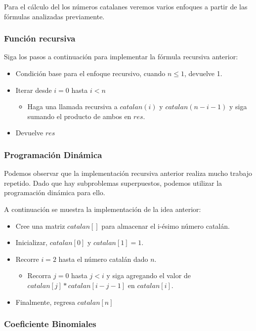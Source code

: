 Para el cálculo del los números catalanes veremos varios enfoques a partir de las fórmulas analizadas previamente.

\subsubsection{Función recursiva}
Siga los pasos a continuación para implementar la fórmula recursiva anterior:

\begin{itemize}
	\item Condición base para el enfoque recursivo, cuando $n \le 1$, devuelve 1.
	\item Iterar desde $i = 0$ hasta $i < n$
	\begin{itemize}
		\item Haga una llamada recursiva a $catalan(i)$ y $catalan(n-i-1)$ y siga sumando el producto de ambos en $res$.
	\end{itemize}
	\item Devuelve $res$
\end{itemize}

\subsubsection{Programación Dinámica}

Podemos observar que la implementación recursiva anterior realiza mucho trabajo repetido. Dado que hay subproblemas superpuestos, podemos utilizar la programación dinámica para ello.

A continuación se muestra la implementación de la idea anterior:

\begin{itemize}
	\item Cree una matriz $catalan[]$ para almacenar el i-ésimo número catalán.
	\item Inicializar, $catalan[0]$ y $catalan[1] = 1$.
	\item Recorre $i = 2$ hasta el número catalán dado $n$.
	\begin{itemize}
		\item Recorra $j = 0$ hasta $j < i$ y siga agregando el valor de $catalan[j] * catalan[i-j-1]$ en $catalan[i]$.
	\end{itemize}
	\item Finalmente, regresa $catalan[n]$
\end{itemize}

\subsubsection{Coeficiente Binomiales}

